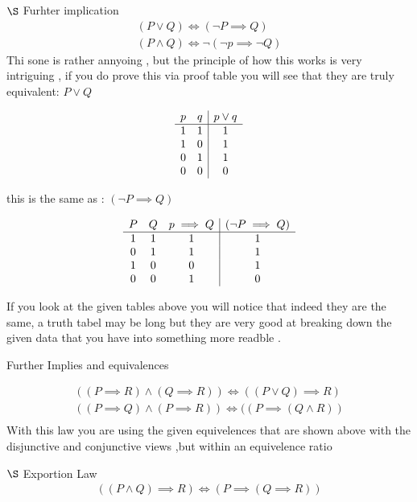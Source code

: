 \documentclass{article}
\theoremstyle{mytheoremstyle}
\theoremstyle{mytheoremstyle}
\theoremstyle{myproblemstyle}
\begin{document}
\item  $\S$ Furhter implication
\[\begin{array}{c}
    (P \lor Q) \iff (\neg P \implies Q) \\
    (P \land Q) \iff \neg(\neg p \implies \neg Q)
\end{array}\]
Thi sone is rather annyoing , but the principle of how this works is very intriguing , if you do prove this via proof table you will see that they are truly equivalent:
$P \lor Q$

\[\begin{array}{c c | c}
    p & q & p \lor q \\
    \hline
    1 & 1 & 1 \\
    1 & 0 & 1 \\
    0 & 1 & 1 \\
    0 & 0 & 0 \\
\end{array}\]



this is the same as :
$(\neg P \implies Q) $


\[\begin{array}{c c c | c}
    P & Q & p \implies Q & (\neg P \implies Q)\\
    \hline
    1 & 1 & 1 & 1 \\
    0 & 1 & 1 & 1 \\
    1 & 0 & 0 & 1 \\
    0 & 0 & 1 & 0 \\

\end{array}\]

If you look at the given tables above you will notice that indeed they are the same, a truth tabel may be long but they are very good at breaking down the given data that you have into something more readble .


\item Further Implies and equivalences

\[\begin{array}{c}
    ((P \implies R) \land (Q \implies R)) \iff ((P \lor Q) \implies R)\\
    ((P \implies Q) \land (P \implies R)) \iff ((P \implies (Q \land R)) \\
\end{array}\]
With this law you are using the given equivelences that are shown above with the disjunctive and conjunctive views ,but within an equivelence ratio


\item  $\S$ Exportion Law
\[\begin{array}{c}
    ((P \land Q) \implies R) \iff (P \implies (Q \implies R))
\end{array}\]
\end{document}
